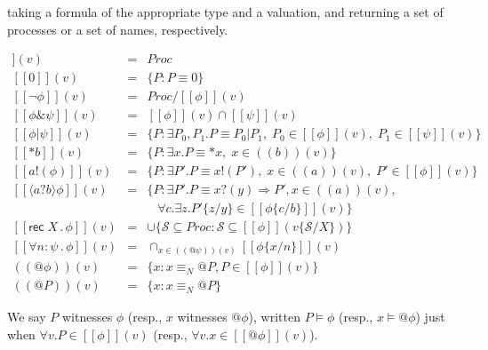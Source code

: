 \documentclass[]{amsart}
\makeatletter
\newcommand{\ldb}{[\![}
\newcommand{\rdb}{]\!]}
\newcommand{\ldrb}{(\!(}
\newcommand{\rdrb}{)\!)}
\newcommand{\id}[1]{\texttt{#1}}
\newcommand{\pzero}{\mathbin{0}}
\newcommand{\juxtap}{\mathbin{\id{|}}}
\newcommand{\concat}{\Rightarrow}
\newcommand{\scong}{\mathbin{\equiv}}
\newcommand{\nameeq}{\mathbin{\equiv_N}}
\newcommand{\binpar}[2]{#1 \juxtap #2}
\newcommand{\prefix}[3]{#1 ? ( #2 ) \concat #3}
\newcommand{\lift}[2]{#1 ! ( #2 )}
\newcommand{\quotep}[1]{@#1}
\newcommand{\dropn}[1]{*#1}
\newcommand{\substn}[2]{\id{\{} #1 / #2 \id{\}}}
\newcommand{\meaningof}[1]{\ldb #1 \rdb}
\newcommand{\pmeaningof}[1]{\ldb #1 \rdb}
\newcommand{\nmeaningof}[1]{\ldrb #1 \rdrb}
\newcommand{\Proc}{\mathbin{Proc}}
\newcommand{\ptrue}{\mathbin{true}}
\newcommand{\pdropf}[1]{* #1}
\newcommand{\plift}[2]{#1 ! ( #2 )}
\newcommand{\pprefix}[3]{\langle #1 ? #2 \rangle #3}
\newcommand{\pgfp}[2]{\textsf{rec} \; #1 \mathbin{.} #2}
\newcommand{\pquant}[3]{\forall #1 \mathbin{:} #2 \mathbin{.} #3}
\theoremstyle{definition}
\theoremstyle{remark}
\numberwithin{equation}{subsection}
\makeatother
\begin{document}
taking a formula of the appropriate type and a valuation, and
returning a set of processes or a set of names, respectively.

\begin{eqnarray}
  \pmeaningof{\ptrue}(v) & = & \Proc \nonumber \\ 
  \pmeaningof{\pzero}(v) & = & \{ P : P \scong \pzero \} \nonumber \\ 
  \pmeaningof{\neg \phi}(v) & = & \Proc / \pmeaningof{\phi}(v) \nonumber\\
  \pmeaningof{\phi \& \psi}(v) & = & \pmeaningof{\phi}(v) \cap \pmeaningof{\psi}(v) \nonumber\\
  \pmeaningof{\binpar{\phi}{\psi}}(v) & = &
  \{ P : \exists P_0, P_1.P \scong \binpar{P_0}{P_1}, \; P_0 \in \pmeaningof{\phi}(v), \;  P_1 \in \pmeaningof{\psi}(v) \} \nonumber\\
  \pmeaningof{\pdropf{b}}(v) & = & \{ P : \exists x.P \scong {\dropn{x}}, \; x \in \nmeaningof{b}(v) \} \nonumber\\	
  \pmeaningof{\plift{a}{\phi}}(v) & = & \{ P : \exists P'.P \scong {\lift{x}{P'}},
                                           \; x \in \nmeaningof{a}(v), 
                                           \; P' \in \pmeaningof{\phi}(v) \} \nonumber\\
  \pmeaningof{\pprefix{a}{b}{\phi}}(v) & = & \{ P : \exists P'.P \scong {\prefix{x}{y}{P'}}, x \in \nmeaningof{a}(v), \nonumber\\
                                   &   &            \; \; \; \forall c . \exists z . {P'}\substn{z}{y} \in \pmeaningof{{\phi}\substn{c}{b}}(v) \} \nonumber\\
  \pmeaningof{\pgfp{X}{\phi}}(v) & = & \cup \{ \mathcal{S} \subseteq \Proc : \mathcal{S} \subseteq \pmeaningof{\phi}(v\substn{\mathcal{S}}{X})\} \nonumber\\
  \pmeaningof{\pquant{n}{\psi}{\phi}}(v) & = & \cap_{x \in \nmeaningof{\quotep{\psi}}(v)} \pmeaningof{{\phi}\substn{x}{n}}(v) \nonumber\\
  \nmeaningof{\quotep{\phi}}(v) & = & \{ x : x \nameeq \quotep{P}, P \in \pmeaningof{\phi}(v) \} \nonumber\\
  \nmeaningof{\quotep{P}}(v) & = & \{ x : x \nameeq  \quotep{P} \} \nonumber
\end{eqnarray}

We say $P$ witnesses $\phi$ (resp., $x$ witnesses $\quotep{\phi}$),
written $P \models \phi$ (resp., $x \models \quotep{\phi}$) just when
$\forall v . P \in \meaningof{\phi}(v)$ (resp., $\forall v . x \in \meaningof{\quotep{\phi}}(v)$).
\end{document}
